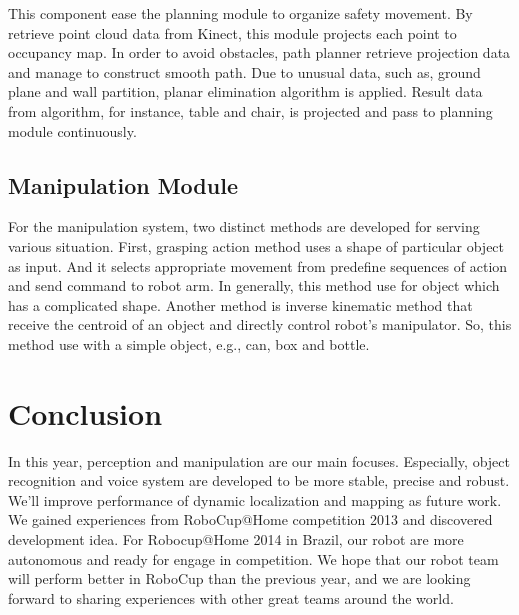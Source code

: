 \documentclass{llncs}
\begin{document}
This component ease the planning module to organize safety movement. By retrieve point cloud data from Kinect, this module projects each point to occupancy map. In order to avoid obstacles, path planner retrieve projection data and manage to construct smooth path. Due to unusual data, such as, ground plane and wall partition, planar elimination algorithm is applied. Result data from algorithm, for instance, table and chair, is projected and pass to planning module continuously\cite{avoid}.

\subsection{Manipulation Module}

For the manipulation system, two distinct methods are developed for serving various situation. First, grasping action method uses a shape of particular object as input. And it selects appropriate movement from predefine sequences of action and send command to robot arm. In generally, this method use for object which has a complicated shape. Another method is inverse kinematic method that receive the centroid of an object and directly control robot's manipulator. So, this method use with a simple object, e.g., can, box and bottle.

\section{Conclusion}

In this year, perception and manipulation are our main focuses. Especially, object recognition and voice system are developed to be more stable, precise and robust. We'll improve performance of dynamic localization and mapping as future work. We gained experiences from RoboCup@Home competition 2013 and discovered development idea. For Robocup@Home 2014 in Brazil, our robot are more autonomous and ready for engage in competition. We hope that our robot team will perform better in RoboCup than the previous year, and we are looking forward to sharing experiences with other great teams around the world.
\end{document}

